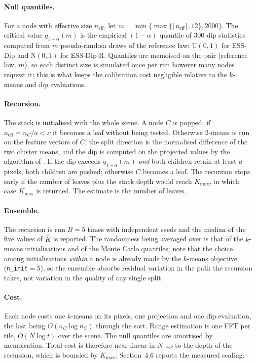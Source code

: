\documentclass[11pt]{article}
\newcommand{\neff}{n_{\mathrm{eff}}}
\begin{document}
\paragraph{Null quantiles.}
For a node with effective size $\neff$, let
$m=\min\{\max\{\lfloor\neff\rceil,12\},2000\}$. The critical value
$q_{1-\alpha}(m)$ is the empirical $(1-\alpha)$ quantile of $300$ dip
statistics computed from $m$ pseudo-random draws of the reference law:
$\mathrm{U}(0,1)$ for ESS-Dip and $\mathrm{N}(0,1)$ for ESS-Dip-R. Quantiles
are memoised on the pair (reference law, $m$), so each distinct size is
simulated once per run however many nodes request it; this is what keeps the
calibration cost negligible relative to the $k$-means and dip evaluations.

\paragraph{Recursion.}
The stack is initialised with the whole scene. A node $C$ is popped; if
$\neff=n_C/a<\nu$ it becomes a leaf without being tested. Otherwise $2$-means
is run on the feature vectors of $C$, the split direction is the normalised
difference of the two cluster means, and the dip is computed on the projected
values by the algorithm of \citet{HartiganHartigan1985}. If the dip exceeds
$q_{1-\alpha}(m)$ \emph{and} both children retain at least $a$ pixels, both
children are pushed; otherwise $C$ becomes a leaf. The recursion stops early if
the number of leaves plus the stack depth would reach $K_{\max}$, in which case
$K_{\max}$ is returned. The estimate is the number of leaves.

\paragraph{Ensemble.}
The recursion is run $B=5$ times with independent seeds and the median of the
five values of $\hat K$ is reported. The randomness being averaged over is that
of the $k$-means initialisations and of the Monte Carlo quantiles; note that
the choice among initialisations \emph{within} a node is already made by the
$k$-means objective (\texttt{n\_init}${}=5$), so the ensemble absorbs residual
variation in the path the recursion takes, not variation in the quality of any
single split.

\paragraph{Cost.}
Each node costs one $k$-means on its pixels, one projection and one dip
evaluation, the last being $O(n_C\log n_C)$ through the sort. Range estimation
is one FFT per tile, $O(N\log t)$ over the scene. The null quantiles are
amortised by memoisation. Total cost is therefore near-linear in $N$ up to the
depth of the recursion, which is bounded by $K_{\max}$; Section~4.6 reports the
measured scaling.
\end{document}
